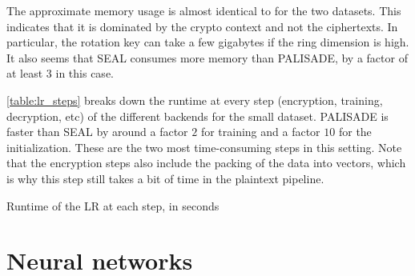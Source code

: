 \documentclass[a4paper,11pt,oneside]{report}
\begin{document}
The approximate memory usage is almost identical to for the two datasets.
This indicates that it is dominated by the crypto context and not the ciphertexts.
In particular, the rotation key can take a few gigabytes if the ring dimension is high.
It also seems that SEAL consumes more memory than PALISADE, by a factor of at least $3$ in this case.

\autoref{table:lr_steps} breaks down the runtime at every step (encryption, training, decryption, etc) of the different backends for the small dataset.
PALISADE is faster than SEAL by around a factor $2$ for training and a factor $10$ for the initialization. 
These are the two most time-consuming steps in this setting.
Note that the encryption steps also include the packing of the data into vectors, which is why this step still takes a bit of time in the plaintext pipeline.

\begin{table}[h!]
  \begin{center}
    \caption{Runtime of the LR at each step, in seconds}
    \label{table:lr_steps}
    \vspace*{2mm}
  \end{center}
\end{table}


\section{Neural networks}\label{sec:eval_cnn}
\end{document}

